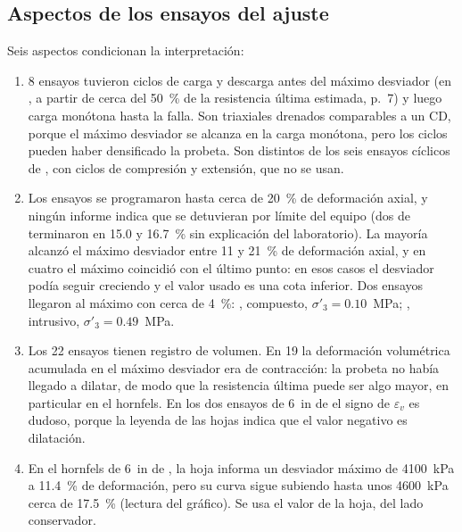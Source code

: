 \documentclass[11pt,letterpaper]{article}
\begin{document}
\subsection{Aspectos de los ensayos del ajuste}
Seis aspectos condicionan la interpretación:
\begin{enumerate}
\item 8 ensayos tuvieron ciclos de carga y descarga antes del máximo desviador (en \citealp{g2012}, a partir de cerca del 50~\% de la resistencia última estimada, p.~7) y luego carga monótona hasta la falla. Son triaxiales drenados comparables a un CD, porque el máximo desviador se alcanza en la carga monótona, pero los ciclos pueden haber densificado la probeta. Son distintos de los seis ensayos cíclicos de \citet{w2022}, con ciclos de compresión y extensión, que no se usan.
\item Los ensayos se programaron hasta cerca de 20~\% de deformación axial, y ningún informe indica que se detuvieran por límite del equipo (dos de \citealp{i2025} terminaron en 15.0 y 16.7~\% sin explicación del laboratorio). La mayoría alcanzó el máximo desviador entre 11 y 21~\% de deformación axial, y en cuatro el máximo coincidió con el último punto: en esos casos el desviador podía seguir creciendo y el valor usado es una cota inferior. Dos ensayos llegaron al máximo con cerca de 4~\%: \citet{g2021}, compuesto, $\sigma'_3 = 0.10$~MPa; \citet{i2025}, intrusivo, $\sigma'_3 = 0.49$~MPa.
\item Los 22 ensayos tienen registro de volumen. En 19 la deformación volumétrica acumulada en el máximo desviador era de contracción: la probeta no había llegado a dilatar, de modo que la resistencia última puede ser algo mayor, en particular en el hornfels. En los dos ensayos de 6~in de \citet{w2022} el signo de $\varepsilon_v$ es dudoso, porque la leyenda de las hojas indica que el valor negativo es dilatación.
\item En el hornfels de 6~in de \citet{w2022}, la hoja informa un desviador máximo de 4100~kPa a 11.4~\% de deformación, pero su curva sigue subiendo hasta unos 4600~kPa cerca de 17.5~\% (lectura del gráfico). Se usa el valor de la hoja, del lado conservador.

\end{enumerate}
\end{document}
